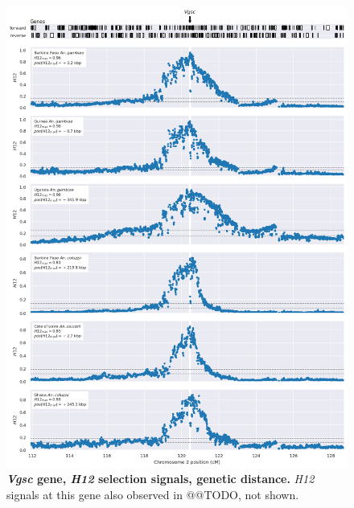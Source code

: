 \documentclass[a4paper,11pt,abstracton,hidelinks]{scrartcl}
\begin{document}
\begin{figure}[t!]
	\begin{center}
		\includegraphics*[width=1.1\linewidth,center]{artwork/locus_vgsc_h12_gdist.png}
	\end{center}
	\caption[\textit{Vgsc} gene, \textit{H12} selection signals, genetic distance]{
	\textbf{\textit{Vgsc} gene, \textit{H12} selection signals, genetic distance.}
	\textit{H12} signals at this gene also observed in @@TODO, not shown. 
	} 
	\label{fig:locus_vgsc_h12_gdist}
\end{figure}



\clearpage
\end{document}
